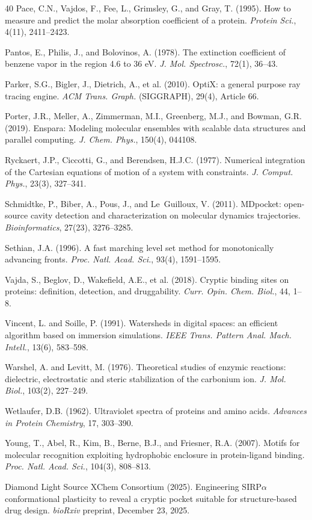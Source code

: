 \documentclass{sn-jnl}
\begin{document}
\begin{thebibliography}{40}
Pace, C.N., Vajdos, F., Fee, L., Grimsley, G., and Gray, T. (1995).
How to measure and predict the molar absorption coefficient of a protein.
\textit{Protein Sci.}, 4(11), 2411--2423.

Pantos, E., Philis, J., and Bolovinos, A. (1978).
The extinction coefficient of benzene vapor in the region 4.6 to 36 eV.
\textit{J. Mol. Spectrosc.}, 72(1), 36--43.

Parker, S.G., Bigler, J., Dietrich, A., et al. (2010).
OptiX: a general purpose ray tracing engine.
\textit{ACM Trans. Graph.} (SIGGRAPH), 29(4), Article 66.

Porter, J.R., Meller, A., Zimmerman, M.I., Greenberg, M.J., and Bowman, G.R. (2019).
Enspara: Modeling molecular ensembles with scalable data structures and parallel computing.
\textit{J. Chem. Phys.}, 150(4), 044108.

Ryckaert, J.P., Ciccotti, G., and Berendsen, H.J.C. (1977).
Numerical integration of the Cartesian equations of motion of a system with constraints.
\textit{J. Comput. Phys.}, 23(3), 327--341.

Schmidtke, P., Biber, A., Pous, J., and Le~Guilloux, V. (2011).
MDpocket: open-source cavity detection and characterization on molecular dynamics trajectories.
\textit{Bioinformatics}, 27(23), 3276--3285.

Sethian, J.A. (1996).
A fast marching level set method for monotonically advancing fronts.
\textit{Proc. Natl. Acad. Sci.}, 93(4), 1591--1595.

Vajda, S., Beglov, D., Wakefield, A.E., et al. (2018).
Cryptic binding sites on proteins: definition, detection, and druggability.
\textit{Curr. Opin. Chem. Biol.}, 44, 1--8.

Vincent, L. and Soille, P. (1991).
Watersheds in digital spaces: an efficient algorithm based on immersion simulations.
\textit{IEEE Trans. Pattern Anal. Mach. Intell.}, 13(6), 583--598.

Warshel, A. and Levitt, M. (1976).
Theoretical studies of enzymic reactions: dielectric, electrostatic and steric stabilization of the carbonium ion.
\textit{J. Mol. Biol.}, 103(2), 227--249.

Wetlaufer, D.B. (1962).
Ultraviolet spectra of proteins and amino acids.
\textit{Advances in Protein Chemistry}, 17, 303--390.

Young, T., Abel, R., Kim, B., Berne, B.J., and Friesner, R.A. (2007).
Motifs for molecular recognition exploiting hydrophobic enclosure in protein-ligand binding.
\textit{Proc. Natl. Acad. Sci.}, 104(3), 808--813.

Diamond Light Source XChem Consortium (2025).
Engineering SIRP$\alpha$ conformational plasticity to reveal a cryptic pocket suitable for structure-based drug design.
\textit{bioRxiv} preprint, December 23, 2025.

\end{thebibliography}
\end{document}
